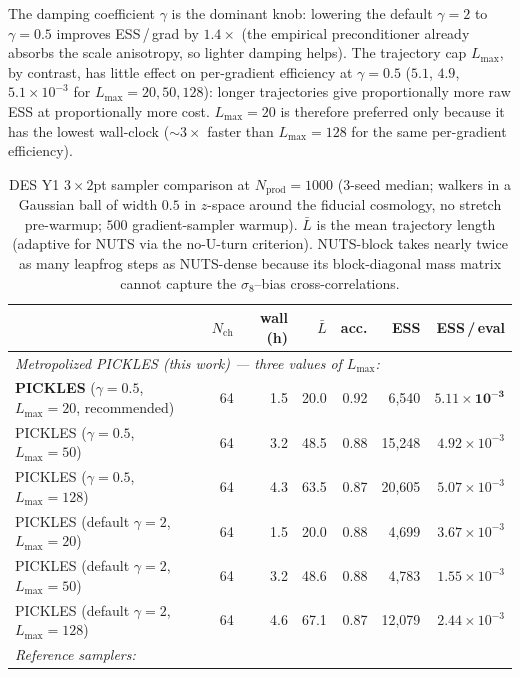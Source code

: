 \documentclass{article}
\begin{document}
The damping coefficient $\gamma$ is the dominant knob: lowering the
default $\gamma=2$ to $\gamma=0.5$ improves ESS\,/\,grad by $1.4\times$
(the empirical preconditioner already absorbs the scale anisotropy, so
lighter damping helps). The trajectory cap $L_{\max}$, by contrast, has
little effect on per-gradient efficiency at $\gamma=0.5$
($5.1$, $4.9$, $5.1\times10^{-3}$ for $L_{\max}=20,50,128$): longer
trajectories give proportionally more raw ESS at proportionally more
cost. $L_{\max}=20$ is therefore preferred only because it has the
lowest wall-clock ($\sim\!3\times$ faster than $L_{\max}=128$ for the
same per-gradient efficiency).

\begin{table}[t]
\centering
\caption{DES Y1 $3\times 2$pt sampler comparison at $N_{\text{prod}}=1000$
($3$-seed median; walkers in a Gaussian ball of width $0.5$ in $z$-space
around the fiducial cosmology, no stretch pre-warmup; $500$
gradient-sampler warmup). $\bar L$ is the mean trajectory length
(adaptive for NUTS via the no-U-turn criterion). NUTS-block takes nearly
twice as many leapfrog steps as NUTS-dense because its block-diagonal
mass matrix cannot capture the $\sigma_8$--bias cross-correlations.}
\label{tab:desMainN1k}
\small
\begin{tabular}{l rrrr rr}
\toprule
& $N_{\text{ch}}$ & wall (h) & $\bar L$ & acc.
& ESS & ESS\,/\,eval \\
\midrule
\multicolumn{7}{l}{\emph{Metropolized PICKLES (this work) --- three values of $L_{\max}$:}} \\
\textbf{PICKLES} ($\gamma=0.5$, $L_{\max}=20$, recommended)
   & 64 & 1.5 & 20.0 & 0.92 & 6{,}540 & $\mathbf{5.11\!\times\!10^{-3}}$ \\
PICKLES ($\gamma=0.5$, $L_{\max}=50$)
   & 64 & 3.2 & 48.5 & 0.88 & 15{,}248 & $4.92\!\times\!10^{-3}$ \\
PICKLES ($\gamma=0.5$, $L_{\max}=128$)
   & 64 & 4.3 & 63.5 & 0.87 & 20{,}605 & $5.07\!\times\!10^{-3}$ \\
PICKLES (default $\gamma=2$, $L_{\max}=20$)
   & 64 & 1.5 & 20.0 & 0.88 & 4{,}699 & $3.67\!\times\!10^{-3}$ \\
PICKLES (default $\gamma=2$, $L_{\max}=50$)
   & 64 & 3.2 & 48.6 & 0.88 & 4{,}783 & $1.55\!\times\!10^{-3}$ \\
PICKLES (default $\gamma=2$, $L_{\max}=128$)
   & 64 & 4.6 & 67.1 & 0.87 & 12{,}079 & $2.44\!\times\!10^{-3}$ \\
\midrule
\multicolumn{7}{l}{\emph{Reference samplers:}} \\

\end{tabular}
\end{table}
\end{document}
